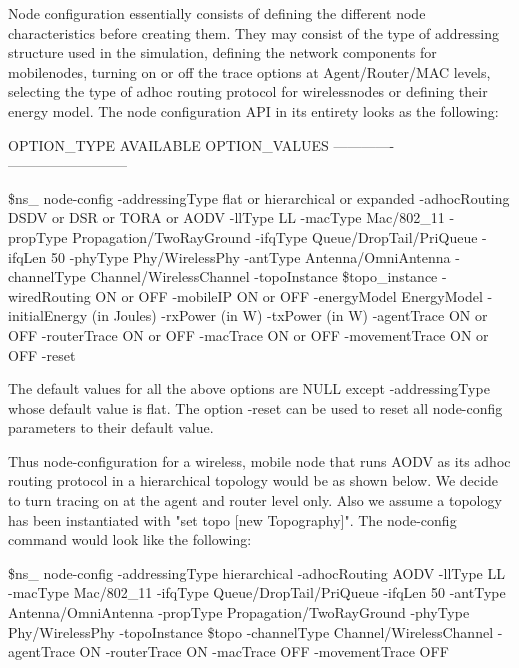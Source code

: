 Node configuration essentially consists of defining the different node
characteristics before creating them. They may consist of the type of
addressing structure used in the simulation, defining the network
components for mobilenodes, turning on or off the trace options at
Agent/Router/MAC levels, selecting the type of adhoc routing protocol for
wirelessnodes or defining their energy model.
The node configuration API in its entirety looks as the following:

\begin{program}
                   OPTION_TYPE    AVAILABLE OPTION_VALUES
                  -------------   --------------------------

 \$ns_ node-config -addressingType flat or hierarchical or expanded
                  -adhocRouting   DSDV or DSR or TORA or AODV
                  -llType         LL
                  -macType        Mac/802_11
                  -propType       Propagation/TwoRayGround
                  -ifqType        Queue/DropTail/PriQueue
                  -ifqLen         50
                  -phyType        Phy/WirelessPhy
                  -antType        Antenna/OmniAntenna
                  -channelType    Channel/WirelessChannel
                  -topoInstance   \$topo_instance
                  -wiredRouting   ON or OFF
                  -mobileIP       ON or OFF
                  -energyModel    EnergyModel
                  -initialEnergy  (in Joules)
                  -rxPower        (in W)
                  -txPower        (in W)
                  -agentTrace     ON or OFF
                  -routerTrace    ON or OFF
                  -macTrace       ON or OFF
                  -movementTrace  ON or OFF
                  -reset
\end{program}

The default values for all the above options are NULL except -addressingType
whose default value is flat. The option -reset can be used to reset all
node-config parameters to their default value.

Thus node-configuration for a wireless, mobile node that runs AODV as its
adhoc routing protocol in a hierarchical topology would be as shown below.
We decide to turn tracing on at the agent and router level only. Also we 
assume a topology has been instantiated with "set topo [new Topography]". 
The node-config command would look like the following:

\begin{program}
  \$ns_ node-config -addressingType hierarchical
                   -adhocRouting AODV
                   -llType LL
                   -macType Mac/802_11
                   -ifqType Queue/DropTail/PriQueue
                   -ifqLen 50
                   -antType Antenna/OmniAntenna
                   -propType Propagation/TwoRayGround
                   -phyType Phy/WirelessPhy
                   -topoInstance \$topo
                   -channelType Channel/WirelessChannel
                   -agentTrace ON
                   -routerTrace ON
                   -macTrace OFF
                   -movementTrace OFF
\end{program}


